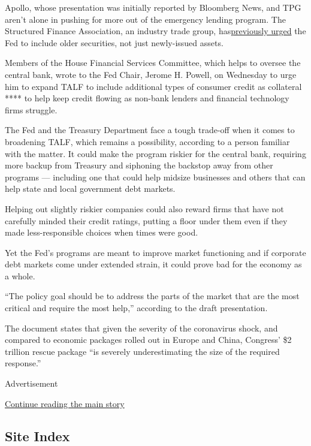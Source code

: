 Apollo, whose presentation was initially reported by Bloomberg News, and
TPG aren't alone in pushing for more out of the emergency lending
program. The Structured Finance Association, an industry trade group,
has\href{https://structuredfinance.org/wp-content/uploads/2020/03/106711__113068379v7_SFA-SPARCC-comment-letter_SFALetterhead.pdf}{previously
urged} the Fed to include older securities, not just newly-issued
assets.

Members of the House Financial Services Committee, which helps to
oversee the central bank, wrote to the Fed Chair, Jerome H. Powell, on
Wednesday to urge him to expand TALF to include additional types of
consumer credit as collateral **** to help keep credit flowing as
non-bank lenders and financial technology firms struggle.

The Fed and the Treasury Department face a tough trade-off when it comes
to broadening TALF, which remains a possibility, according to a person
familiar with the matter. It could make the program riskier for the
central bank, requiring more backup from Treasury and siphoning the
backstop away from other programs --- including one that could help
midsize businesses and others that can help state and local government
debt markets.

Helping out slightly riskier companies could also reward firms that have
not carefully minded their credit ratings, putting a floor under them
even if they made less-responsible choices when times were good.

Yet the Fed's programs are meant to improve market functioning and if
corporate debt markets come under extended strain, it could prove bad
for the economy as a whole.

``The policy goal should be to address the parts of the market that are
the most critical and require the most help,'' according to the draft
presentation.

The document states that given the severity of the coronavirus shock,
and compared to economic packages rolled out in Europe and China,
Congress' \$2 trillion rescue package ``is severely underestimating the
size of the required response.''

Advertisement

\protect\hyperlink{after-bottom}{Continue reading the main story}

\hypertarget{site-index}{%
\subsection{Site Index}\label{site-index}}

